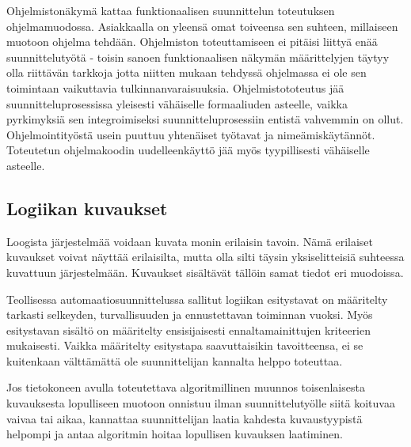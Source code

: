 \documentclass[finnish,12pt]{article}
\begin{document}
Ohjelmistonäkymä kattaa funktionaalisen suunnittelun toteutuksen ohjelmamuodossa.
Asiakkaalla on yleensä omat toiveensa sen suhteen, millaiseen muotoon ohjelma tehdään.
Ohjelmiston toteuttamiseen ei pitäisi liittyä enää suunnittelutyötä - toisin sanoen funktionaalisen näkymän määrittelyjen täytyy olla riittävän tarkkoja jotta niitten mukaan tehdyssä ohjelmassa ei ole sen toimintaan vaikuttavia tulkinnanvaraisuuksia.
Ohjelmistototeutus jää suunnitteluprosessissa yleisesti vähäiselle formaaliuden asteelle, vaikka pyrkimyksiä sen integroimiseksi suunnitteluprosessiin entistä vahvemmin on ollut.
Ohjelmointityöstä usein puuttuu yhtenäiset työtavat ja nimeämiskäytännöt.
Toteutetun ohjelmakoodin uudelleenkäyttö jää myös tyypillisesti vähäiselle asteelle.

	\subsection{Logiikan kuvaukset}

Loogista järjestelmää voidaan kuvata monin erilaisin tavoin.
Nämä erilaiset kuvaukset voivat näyttää erilaisilta,
mutta olla silti täysin yksiselitteisiä suhteessa kuvattuun järjestelmään.
Kuvaukset sisältävät tällöin samat tiedot eri muodoissa.

Teollisessa automaatiosuunnittelussa sallitut logiikan esitystavat on määritelty
tarkasti selkeyden, turvallisuuden ja ennustettavan toiminnan vuoksi.
Myös esitystavan sisältö on määritelty ensisijaisesti ennaltamainittujen kriteerien mukaisesti.
Vaikka määritelty esitystapa saavuttaisikin tavoitteensa, ei se kuitenkaan välttämättä ole
suunnittelijan kannalta helppo toteuttaa.

Jos tietokoneen avulla toteutettava algoritmillinen muunnos toisenlaisesta kuvauksesta lopulliseen muotoon onnistuu ilman suunnittelutyölle siitä koituvaa vaivaa tai aikaa, kannattaa suunnittelijan laatia kahdesta kuvaustyypistä helpompi ja antaa algoritmin hoitaa lopullisen kuvauksen laatiminen.

\end{document}
